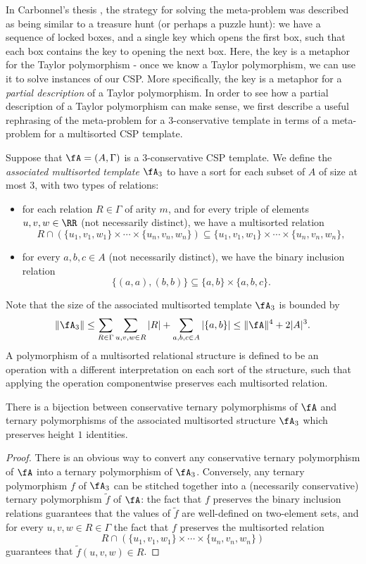In Carbonnel's thesis \cite{carbonnel-thesis}, the strategy for solving the meta-problem was described as being similar to a treasure hunt (or perhaps a puzzle hunt): we have a sequence of locked boxes, and a single key which opens the first box, such that each box contains the key to opening the next box. Here, the key is a metaphor for the Taylor polymorphism - once we know a Taylor polymorphism, we can use it to solve instances of our CSP. More specifically, the key is a metaphor for a \emph{partial description} of a Taylor polymorphism. In order to see how a partial description of a Taylor polymorphism can make sense, we first describe a useful rephrasing of the meta-problem for a $3$-conservative template in terms of a meta-problem for a multisorted CSP template.

\begin{defn} Suppose that $\fA = (A,\Gamma)$ is a $3$-conservative CSP template. We define the \emph{associated multisorted template} $\fA_3$ to have a sort for each subset of $A$ of size at most $3$, with two types of relations:
\begin{itemize}
\item for each relation $R \in \Gamma$ of arity $m$, and for every triple of elements $u,v,w \in \RR$ (not necessarily distinct), we have a multisorted relation
\[
R \cap (\{u_1,v_1,w_1\} \times \cdots \times \{u_n,v_n,w_n\}) \subseteq \{u_1,v_1,w_1\} \times \cdots \times \{u_n,v_n,w_n\},
\]
\item for every $a,b,c \in A$ (not necessarily distinct), we have the binary inclusion relation
\[
\{(a,a), (b,b)\} \subseteq \{a,b\} \times \{a,b,c\}.
\]
\end{itemize}
\end{defn}

Note that the size of the associated multisorted template $\fA_3$ is bounded by
\[
\|\fA_3\| \le \sum_{R \in \Gamma} \sum_{u,v,w \in R} |R| + \sum_{a,b,c \in A} |\{a,b\}| \le \|\fA\|^4 + 2|A|^3.
\]
A polymorphism of a multisorted relational structure is defined to be an operation with a different interpretation on each sort of the structure, such that applying the operation componentwise preserves each multisorted relation.

\begin{prop}\label{prop-conservative-multi-ternary} There is a bijection between conservative ternary polymorphisms of $\fA$ and ternary polymorphisms of the associated multisorted structure $\fA_3$ which preserves height $1$ identities.
\end{prop}
\begin{proof} There is an obvious way to convert any conservative ternary polymorphism of $\fA$ into a ternary polymorphism of $\fA_3$. Conversely, any ternary polymorphism $f$ of $\fA_3$ can be stitched together into a (necessarily conservative) ternary polymorphism $\tilde{f}$ of $\fA$: the fact that $f$ preserves the binary inclusion relations guarantees that the values of $\tilde{f}$ are well-defined on two-element sets, and for every $u,v,w \in R \in \Gamma$ the fact that $f$ preserves the multisorted relation
\[
R \cap (\{u_1,v_1,w_1\} \times \cdots \times \{u_n,v_n,w_n\})
\]
guarantees that $\tilde{f}(u,v,w) \in R$.
\end{proof}

